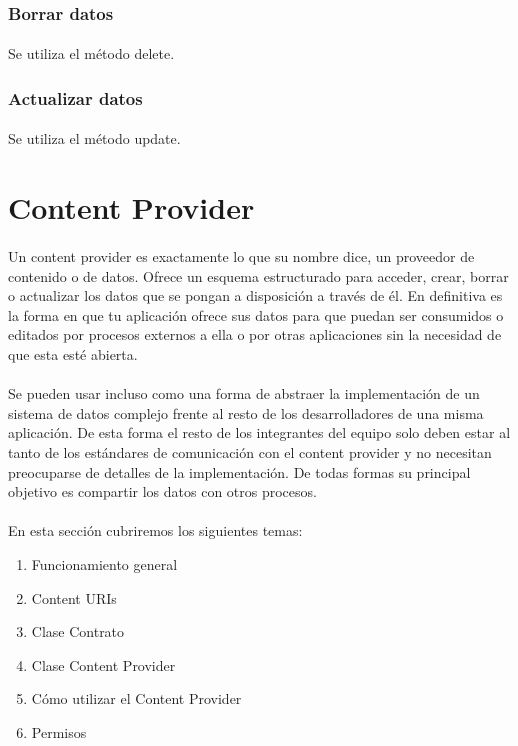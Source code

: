 \documentclass[10pt]{extarticle}
\begin{document}
\subsubsection{Borrar datos}
\paragraph{}
Se utiliza el método delete.

\subsubsection{Actualizar datos}
\paragraph{}
Se utiliza el método update.


\section{Content Provider}

\paragraph{}
Un content provider es exactamente lo que su nombre dice, un proveedor de contenido o de datos. Ofrece un esquema estructurado para acceder, crear, borrar o actualizar los datos que se pongan a disposición a través de él. En definitiva es la forma en que tu aplicación ofrece sus datos para que puedan ser consumidos o editados por procesos externos a ella o por otras aplicaciones sin la necesidad de que esta esté abierta.

\paragraph{}
Se pueden usar incluso como una forma de abstraer la implementación de un sistema de datos complejo frente al resto de los desarrolladores de una misma aplicación. De esta forma el resto de los integrantes del equipo solo deben estar al tanto de los estándares de comunicación con el content provider y no necesitan preocuparse de detalles de la implementación. De todas formas su principal objetivo es compartir los datos con otros procesos.

\paragraph{}
En esta sección cubriremos los siguientes temas:
\begin{enumerate}
	\item Funcionamiento general
	\item Content URIs
	\item Clase Contrato
	\item Clase Content Provider
	\item Cómo utilizar el Content Provider
	\item Permisos
\end{enumerate}
\end{document}
